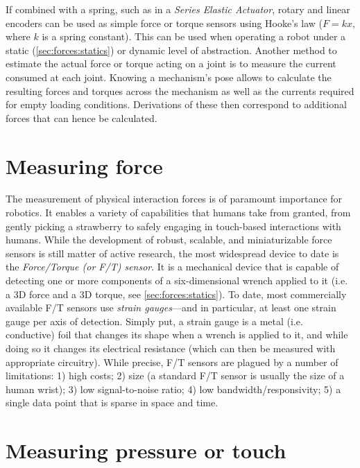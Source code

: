 If combined with a spring, such as in a \textsl{Series Elastic Actuator}, rotary and linear encoders can be used as simple force or torque sensors using Hooke's law ($F=kx$, where $k$ is a spring constant).
This can be used when operating a robot under a static (\cref{sec:forces:statics}) or dynamic level of abstraction.
Another method to estimate the actual force or torque acting on a joint is to measure the current consumed at each joint. Knowing a mechanism's pose allows to calculate the resulting forces and torques across the mechanism as well as the currents required for empty loading conditions. Derivations of these then correspond to additional forces that can hence be calculated.

\section{Measuring force}

The measurement of physical interaction forces is of paramount importance for robotics.
It enables a variety of capabilities that humans take from granted, from gently picking a strawberry to safely engaging in touch-based interactions with humans.
While the development of robust, scalable, and miniaturizable force sensors is still matter of active research, the most widespread device to date is the \textsl{Force/Torque (or F/T) sensor}. It is a mechanical device that is capable of detecting one or more components of a six-dimensional wrench applied to it (i.e. a 3D force and a 3D torque, see \cref{sec:forces:statics}).
To date, most commercially available F/T sensors use \textsl{strain gauges}---and in particular, at least one strain gauge per axis of detection. Simply put, a strain gauge is a metal (i.e. conductive) foil that changes its shape when a wrench is applied to it, and while doing so it changes its electrical resistance (which can then be measured with appropriate circuitry).
While precise, F/T sensors are plagued by a number of limitations: 1) high costs; 2) size (a standard F/T sensor is usually the size of a human wrist); 3) low signal-to-noise ratio; 4) low bandwidth/responsivity; 5) a single data point that is sparse in space and time.

\section{Measuring pressure or touch}

